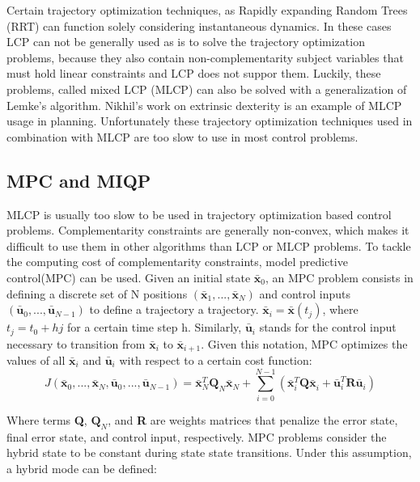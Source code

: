 \documentclass[12,twoside]{TFG-GM}
\theoremstyle{definition}
\theoremstyle{remark}
\newcommand*\diff[1]{\bar{#1}}
\begin{document}
Certain trajectory optimization techniques, as Rapidly expanding Random Trees (RRT) can function solely considering instantaneous dynamics. In these cases LCP can not be generally used as is to solve the trajectory optimization problems, because they also contain non-complementarity subject variables that must hold linear constraints and LCP does not suppor them. Luckily, these problems, called mixed LCP (MLCP) can also be solved with a generalization of Lemke's algorithm. Nikhil's work on extrinsic dexterity \cite{nik1} is an example of MLCP usage in planning. Unfortunately these trajectory optimization techniques used in combination with MLCP are too slow to use in most control problems. 

\subsection{MPC and MIQP}
\label{subsec:MPC}

MLCP is usually too slow to be used in trajectory optimization based control problems. Complementarity constraints are generally non-convex, which makes it difficult to use them in other algorithms than LCP or MLCP problems. To tackle the computing cost of complementarity constraints, model predictive control(MPC) can be used. Given an initial state $\diff{\textbf{x}}_0$, an MPC problem consists in defining a discrete set of N positions $(\diff{\textbf{x}}_1, ..., \diff{\textbf{x}}_N)$ and control inputs $(\diff{\textbf{u}}_0, ..., \diff{\textbf{u}}_{N-1})$ to define a trajectory a trajectory. $\diff{\textbf{x}}_i = \diff{\textbf{x}}(t_j)$, where $t_j = t_0 + h j$ for a certain time step h. Similarly, $\diff{\textbf{u}}_i$ stands for the control input necessary to transition from $\diff{\textbf{x}}_i$ to $\diff{\textbf{x}}_{i+1}$. Given this notation, MPC optimizes the values of all $\diff{\textbf{x}}_i$ and $\diff{\textbf{u}}_i$ with respect to a certain cost function:
\begin{equation} \label{eq:cost_function}
J(\diff{\textbf{x}}_0, ..., \diff{\textbf{x}}_N, \diff{\textbf{u}}_0, ..., \diff{\textbf{u}}_{N-1}) = \diff{\textbf{x}}_N^T \textbf{Q}_N \diff{\textbf{x}}_N^{} + \sum\limits_{i = 0}^{N-1} \left( \diff{\textbf{x}}_i^T \textbf{Q} \diff{\textbf{x}}_i^{} + \diff{\textbf{u}}_{i}^T \textbf{R} \diff{\textbf{u}}_{i}^{} \right)
\end{equation}

Where terms \textbf{Q}, $\textbf{Q}_N$, and \textbf{R} are weights matrices that penalize the error state, final error state, and control input, respectively. MPC problems consider the hybrid state to be constant during state state transitions. Under this assumption, a hybrid mode can be defined:
\end{document}
